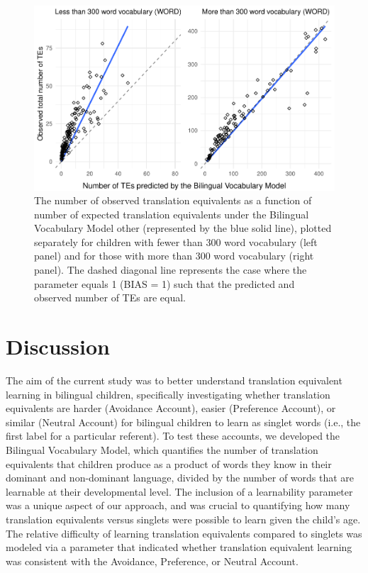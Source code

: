 \documentclass[
  english,
  ,man,floatsintext]{apa6}
\begin{document}
~

\begin{figure}

{\centering \includegraphics[width=1.2\linewidth]{paper_TE_bilingual_vocabulary_model_files/figure-latex/fig6-1} 

}

\caption{The number of observed translation equivalents as a function of number of expected translation equivalents under the Bilingual Vocabulary Model other (represented by the blue solid line), plotted separately for children with fewer than 300 word vocabulary (left panel) and for those with more than 300 word vocabulary (right panel). The dashed diagonal line represents the case where the parameter equals 1 (BIAS = 1) such that the predicted and observed number of TEs are equal.}\label{fig:fig6}
\end{figure}

\hypertarget{discussion}{%
\section{Discussion}\label{discussion}}

The aim of the current study was to better understand translation equivalent learning in bilingual children, specifically investigating whether translation equivalents are harder (Avoidance Account), easier (Preference Account), or similar (Neutral Account) for bilingual children to learn as singlet words (i.e., the first label for a particular referent). To test these accounts, we developed the Bilingual Vocabulary Model, which quantifies the number of translation equivalents that children produce as a product of words they know in their dominant and non-dominant language, divided by the number of words that are learnable at their developmental level. The inclusion of a learnability parameter was a unique aspect of our approach, and was crucial to quantifying how many translation equivalents versus singlets were possible to learn given the child's age. The relative difficulty of learning translation equivalents compared to singlets was modeled via a parameter that indicated whether translation equivalent learning was consistent with the Avoidance, Preference, or Neutral Account.
\end{document}
